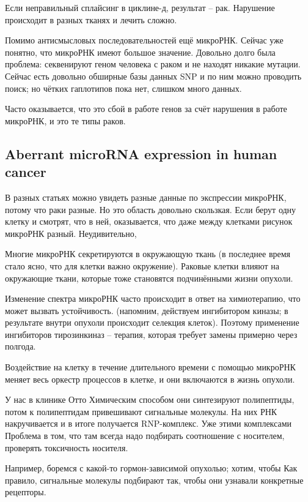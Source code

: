 \documentclass[main.tex]{subfiles}
\begin{document}


Если неправильный сплайсинг в циклине-д, результат -- рак.
Нарушение происходит в разных тканях и лечить сложно.

Помимо антисмысловых последовательностей ещё микроРНК.
Сейчас уже понятно, что микроРНК имеют большое значение.
Довольно долго была проблема: секвенируют геном человека с раком и не находят никакие мутации.
Сейчас есть довольно обширные базы данных SNP и по ним можно проводить поиск;
но чётких гаплотипов пока нет, слишком много данных.

Часто оказывается, что это сбой в работе генов за счёт нарушения в работе микроРНК, и это те типы раков.

\subsection{Aberrant microRNA expression in human cancer}

В разных статьях можно увидеть разные данные по экспрессии микроРНК, потому что раки разные.
Но это область довольно скользкая.
Если берут одну клетку и смотрят, что в ней, оказывается, что даже между клетками рисунок микроРНК разный.
Неудивительно,

Многие микроРНК секретируются в окружающую ткань (в последнее время стало ясно, что для клетки важно окружение).
Раковые клетки влияют на окружающие ткани, которые тоже становятся подчинёнными жизни опухоли.

Изменение спектра микроРНК часто происходит в ответ на химиотерапию, что может вызвать устойчивость.
(напомним, действуем ингибитором киназы; в результате внутри опухоли происходит селекция клеток).
Поэтому применение ингибиторов тирозинкиназ -- терапия, которая требует замены примерно через полгода.

Воздействие на клетку в течение длительного времени с помощью микроРНК меняет весь оркестр процессов в клетке, и они включаются в жизнь опухоли.

У нас в клинике Отто
Химическим способом они синтезируют полипептиды, потом к полипептидам привешивают сигнальные молекулы.
На них РНК накручивается и в итоге получается RNP-комплекс.
Уже этими комплексами
Проблема в том, что там всегда надо подбирать соотношение с носителем, проверять токсичность носителя.

Например, боремся с какой-то гормон-зависимой опухолью; хотим, чтобы 
Как правило, сигнальные молекулы подбирают так, чтобы они узнавали конкретные рецепторы.
\end{document}
